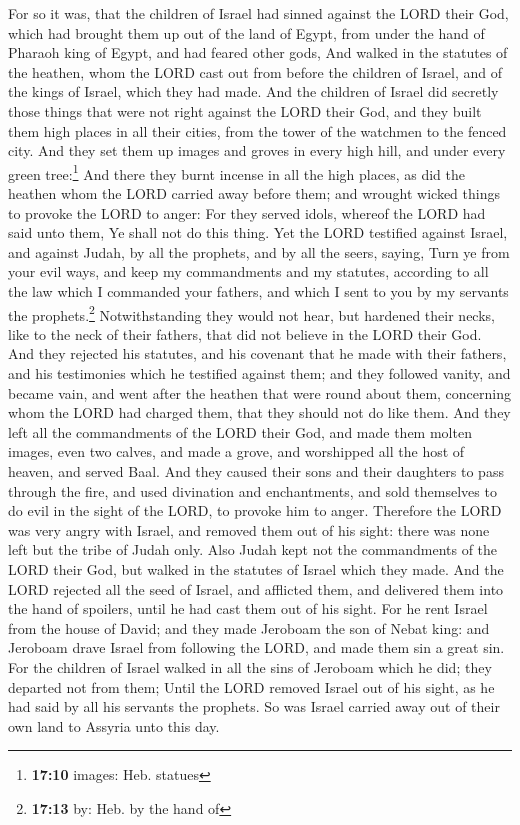  For so it was, that the children of Israel had sinned
against the LORD their God, which had brought them up out of the land of
Egypt, from under the hand of Pharaoh king of Egypt, and had feared
other gods,  And walked in the statutes of the heathen,
whom the LORD cast out from before the children of Israel, and of the
kings of Israel, which they had made.  And the children of
Israel did secretly those things that were not right against the LORD
their God, and they built them high places in all their cities, from the
tower of the watchmen to the fenced city.  And they set
them up images and groves in every high hill, and under every green
tree:\footnote{\textbf{17:10} images: Heb. statues}  And
there they burnt incense in all the high places, as did the heathen whom
the LORD carried away before them; and wrought wicked things to provoke
the LORD to anger:  For they served idols, whereof the
LORD had said unto them, Ye shall not do this thing.  Yet
the LORD testified against Israel, and against Judah, by all the
prophets, and by all the seers, saying, Turn ye from your evil ways, and
keep my commandments and my statutes, according to all the law which I
commanded your fathers, and which I sent to you by my servants the
prophets.\footnote{\textbf{17:13} by: Heb. by the hand of}
 Notwithstanding they would not hear, but hardened their
necks, like to the neck of their fathers, that did not believe in the
LORD their God.  And they rejected his statutes, and his
covenant that he made with their fathers, and his testimonies which he
testified against them; and they followed vanity, and became vain, and
went after the heathen that were round about them, concerning whom the
LORD had charged them, that they should not do like them.
 And they left all the commandments of the LORD their
God, and made them molten images, even two calves, and made a grove, and
worshipped all the host of heaven, and served Baal.  And
they caused their sons and their daughters to pass through the fire, and
used divination and enchantments, and sold themselves to do evil in the
sight of the LORD, to provoke him to anger.  Therefore
the LORD was very angry with Israel, and removed them out of his sight:
there was none left but the tribe of Judah only.  Also
Judah kept not the commandments of the LORD their God, but walked in the
statutes of Israel which they made.  And the LORD
rejected all the seed of Israel, and afflicted them, and delivered them
into the hand of spoilers, until he had cast them out of his sight.
 For he rent Israel from the house of David; and they
made Jeroboam the son of Nebat king: and Jeroboam drave Israel from
following the LORD, and made them sin a great sin.  For
the children of Israel walked in all the sins of Jeroboam which he did;
they departed not from them;  Until the LORD removed
Israel out of his sight, as he had said by all his servants the
prophets. So was Israel carried away out of their own land to Assyria
unto this day.

